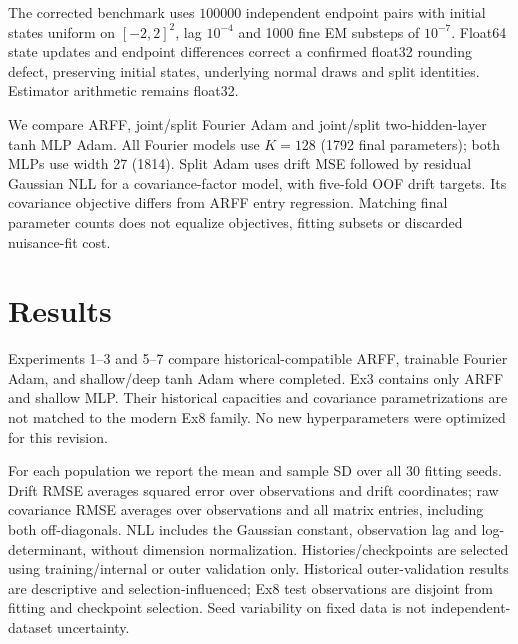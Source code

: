 \documentclass{article}
\begin{document}
The corrected benchmark uses $100000$ independent endpoint pairs with initial states uniform on $[-2,2]^2$, lag $10^{-4}$ and 1000 fine EM substeps of $10^{-7}$. Float64 state updates and endpoint differences correct a confirmed float32 rounding defect, preserving initial states, underlying normal draws and split identities. Estimator arithmetic remains float32.

We compare ARFF, joint/split Fourier Adam and joint/split two-hidden-layer tanh MLP Adam. All Fourier models use $K=128$ (1792 final parameters); both MLPs use width 27 (1814). Split Adam uses drift MSE followed by residual Gaussian NLL for a covariance-factor model, with five-fold OOF drift targets. Its covariance objective differs from ARFF entry regression. Matching final parameter counts does not equalize objectives, fitting subsets or discarded nuisance-fit cost.

\section{Results}\label{sec:results}
Experiments 1--3 and 5--7 compare historical-compatible ARFF, trainable Fourier Adam, and shallow/deep tanh Adam where completed. Ex3 contains only ARFF and shallow MLP. Their historical capacities and covariance parametrizations are not matched to the modern Ex8 family. No new hyperparameters were optimized for this revision.

For each population we report the mean and sample SD over all 30 fitting seeds. Drift RMSE averages squared error over observations and drift coordinates; raw covariance RMSE averages over observations and all matrix entries, including both off-diagonals. NLL includes the Gaussian constant, observation lag and log-determinant, without dimension normalization. Histories/checkpoints are selected using training/internal or outer validation only. Historical outer-validation results are descriptive and selection-influenced; Ex8 test observations are disjoint from fitting and checkpoint selection. Seed variability on fixed data is not independent-dataset uncertainty.
\end{document}
